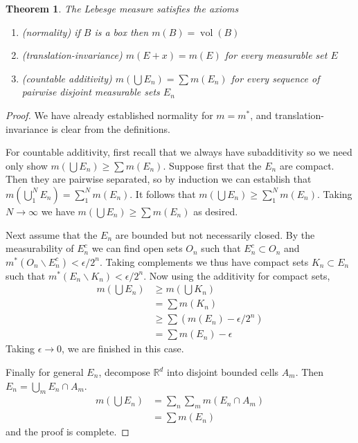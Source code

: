\documentclass[11pt,oneside]{amsbook}
\renewcommand{\setminus}{\smallsetminus}
\newcommand{\RR}{{\mathbb R}}
\DeclareMathOperator{\vol}{vol}
\theoremstyle{definition}
\theoremstyle{plain}
\newtheorem{thm}{Theorem}[section]
\theoremstyle{definition}
\theoremstyle{remark}
\numberwithin{equation}{section}
\numberwithin{figure}{section}
\begin{document}
\begin{thm}
  The Lebesge measure satisfies the axioms
  \begin{enumerate}
  \item (normality) if $B$ is a box then $m(B)=\vol(B)$
  \item (translation-invariance) $m(E+x)=m(E)$ for every measurable set $E$
  \item (countable additivity) $m(\bigcup E_n)=\sum m(E_n)$ for every sequence of pairwise disjoint measurable sets $E_n$
  \end{enumerate}
\end{thm}

\begin{proof}
  We have already established normality for $m=m^*$, and translation-invariance is clear from the definitions.

  For countable additivity, first recall that we always have subadditivity so we need only show $m(\bigcup E_n)\geq\sum m(E_n)$. Suppose first that the $E_n$ are compact. Then they are pairwise separated, so by induction we can establish that $m(\bigcup_1^NE_n)=\sum_1^Nm(E_n)$. It follows that $m(\bigcup E_n)\geq\sum_1^Nm(E_n)$. Taking $N\to\infty$ we have $m(\bigcup E_n)\geq\sum m(E_n)$ as desired.

  Next assume that the $E_n$ are bounded but not necessarily closed. By the measurability of $E_n^c$ we can find open sets $O_n$ such that $E_n^c\subset O_n$ and $m^*(O_n\setminus E_n^c)<\epsilon/2^n$. Taking complements we thus have compact sets $K_n\subset E_n$ such that $m^*(E_n\setminus K_n)<\epsilon/2^n$. Now using the additivity for compact sets,
  \begin{align*}
    m(\bigcup E_n)&\geq m(\bigcup K_n)\\
                  &=\sum m(K_n)\\
                  &\geq\sum(m(E_n)-\epsilon/2^n)\\
                  &=\sum m(E_n)-\epsilon
  \end{align*}
  Taking $\epsilon\to0$, we are finished in this case.

  Finally for general $E_n$, decompose $\RR^d$ into disjoint bounded cells $A_m$. Then $E_n=\bigcup_mE_n\cap A_m$.
  \begin{align*}
    m(\bigcup E_n)&=\sum_n\sum_mm(E_n\cap A_m)\\
                  &=\sum m(E_n)
  \end{align*}
  and the proof is complete.
\end{proof}
\end{document}
